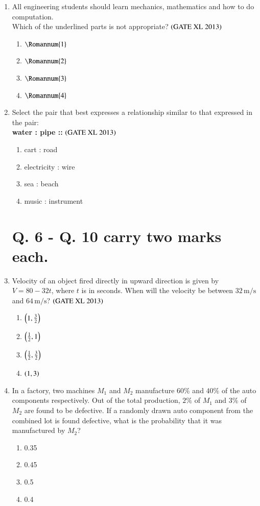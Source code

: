 \documentclass[journal]{IEEEtran}
\begin{document}
\begin{enumerate}
\item 
All engineering students should learn mechanics, mathematics and how to do computation.\\
Which of the underlined parts is not appropriate? \hfill $\left(\text{GATE XL 2013}\right)$
\begin{enumerate}
    \item $\Romannum{1}$
    \item $\Romannum{2}$
    \item $\Romannum{3}$
    \item $\Romannum{4}$
\end{enumerate}


\item
Select the pair that best expresses a relationship similar to that expressed in the pair: \\
\textbf{water : pipe ::} \hfill $\left(\text{GATE XL 2013}\right)$
\begin{enumerate}
    \item cart : road
    \item electricity : wire
    \item sea : beach
    \item music : instrument
\end{enumerate}

\section*{Q. 6 - Q. 10 carry two marks each.}

\item  
Velocity of an object fired directly in upward direction is given by $V = 80 - 32t$, where $t$  is in seconds. When will the velocity be between $32\,\mathrm{m/s}$ and $64\,\mathrm{m/s}$? \hfill $\left(\text{GATE XL 2013}\right)$
\begin{enumerate}
    \item $\left(1, \frac{3}{2}\right)$
    \item $\left(\frac{1}{2}, 1\right)$
    \item $\left(\frac{1}{2}, \frac{3}{2}\right)$
    \item $\left(1, 3\right)$
\end{enumerate}

\item  
In a factory, two machines $M_1$ and $M_2$ manufacture $60\%$ and $40\%$ of the auto components respectively. Out of the total production, $2\%$ of $M_1$ and $3\%$ of $M_2$ are found to be defective. If a randomly drawn auto component from the combined lot is found defective, what is the probability that it was manufactured by $M_2$? \hfill \textit\textit{}
\begin{enumerate}
    \item 0.35
    \item 0.45
    \item 0.5
    \item 0.4
\end{enumerate}


\end{enumerate}
\end{document}
